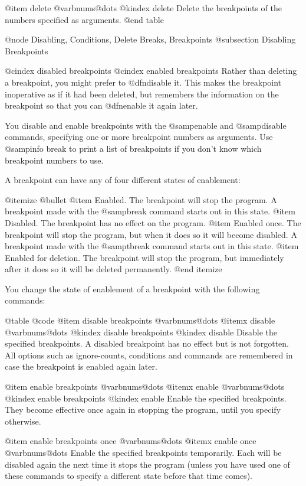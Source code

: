 @item delete @var{bnums}@dots{}
@kindex delete
Delete the breakpoints of the numbers specified as arguments.
@end table

@node Disabling, Conditions, Delete Breaks, Breakpoints
@subsection Disabling Breakpoints

@cindex disabled breakpoints
@cindex enabled breakpoints
Rather than deleting a breakpoint, you might prefer to @dfn{disable} it.
This makes the breakpoint inoperative as if it had been deleted, but
remembers the information on the breakpoint so that you can @dfn{enable}
it again later.

You disable and enable breakpoints with the @samp{enable} and
@samp{disable} commands, specifying one or more breakpoint numbers as
arguments.  Use @samp{info break} to print a list of breakpoints if you
don't know which breakpoint numbers to use.

A breakpoint can have any of four different states of enablement:

@itemize @bullet
@item
Enabled.  The breakpoint will stop the program.  A breakpoint made
with the @samp{break} command starts out in this state.
@item
Disabled.  The breakpoint has no effect on the program.
@item
Enabled once.  The breakpoint will stop the program, but
when it does so it will become disabled.  A breakpoint made
with the @samp{tbreak} command starts out in this state.
@item
Enabled for deletion.  The breakpoint will stop the program, but
immediately after it does so it will be deleted permanently.
@end itemize

You change the state of enablement of a breakpoint with the following
commands:

@table @code
@item disable breakpoints @var{bnums}@dots{}
@itemx disable @var{bnums}@dots{}
@kindex disable breakpoints
@kindex disable
Disable the specified breakpoints.  A disabled breakpoint has no
effect but is not forgotten.  All options such as ignore-counts,
conditions and commands are remembered in case the breakpoint is
enabled again later.

@item enable breakpoints @var{bnums}@dots{}
@itemx enable @var{bnums}@dots{}
@kindex enable breakpoints
@kindex enable
Enable the specified breakpoints.  They become effective once again in
stopping the program, until you specify otherwise.

@item enable breakpoints once @var{bnums}@dots{}
@itemx enable once @var{bnums}@dots{}
Enable the specified breakpoints temporarily.  Each will be disabled
again the next time it stops the program (unless you have used one of
these commands to specify a different state before that time comes).

